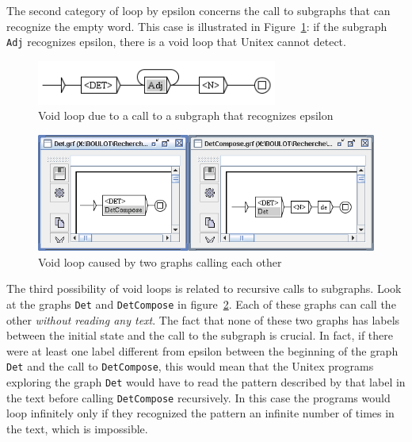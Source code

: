 \bigskip
\noindent The second category of loop by epsilon concerns the call to subgraphs
that can recognize the empty word. This case is illustrated in
Figure~\ref{fig-epsilon-subgraph-loop}: if the subgraph
\verb+Adj+ recognizes epsilon, there is a void loop that Unitex cannot detect.

\bigskip
\begin{figure}[!ht]
\begin{center}
\includegraphics[width=7.9cm]{resources/img/fig6-9.png}
\caption{Void loop due to a call to a subgraph that recognizes epsilon
\label{fig-epsilon-subgraph-loop}}
\end{center}
\end{figure}

\begin{figure}[!ht]
\begin{center}
\includegraphics[width=15.5cm]{resources/img/fig6-10.png}
\caption{Void loop caused by two graphs calling each
other\label{fig-recursive-calls-loop}}
\end{center}
\end{figure}

\noindent The third possibility of void loops is related to recursive calls to
subgraphs. Look at the graphs \verb+Det+ and \verb+DetCompose+ in
figure~\ref{fig-recursive-calls-loop}. Each of these graphs can call
the other \textit{without reading any text}. The fact that none of these two
graphs has labels between the initial state and the call to the subgraph is
crucial. In fact, if there were at least one label different from epsilon between
the beginning of the graph \verb+Det+ and the call to \verb+DetCompose+, this
would mean that the Unitex programs exploring the graph \verb+Det+ would have to
read the pattern described by that label in the text before calling
\verb+DetCompose+ recursively. In this case the programs would loop infinitely
only if they  recognized the pattern an infinite number of times in the text,
which is impossible.


